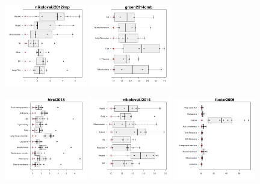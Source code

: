 \documentclass[12pt]{article}\usepackage[]{graphicx}\usepackage[]{color}
\begin{document}
\begin{appendices}
\begin{figure}[htb]
  \includegraphics[width = 0.32\textwidth]{./figure/allqseps-23.pdf}
  \includegraphics[width = 0.32\textwidth]{./figure/allqseps-24.pdf}
\end{figure}
\begin{figure}[htb]\ContinuedFloat
  \includegraphics[width = 0.32\textwidth]{./figure/allqseps-25.pdf}
  \includegraphics[width = 0.32\textwidth]{./figure/allqseps-26.pdf}
  \includegraphics[width = 0.32\textwidth]{./figure/allqseps-27.pdf}

\end{figure}
\end{appendices}
\end{document}
